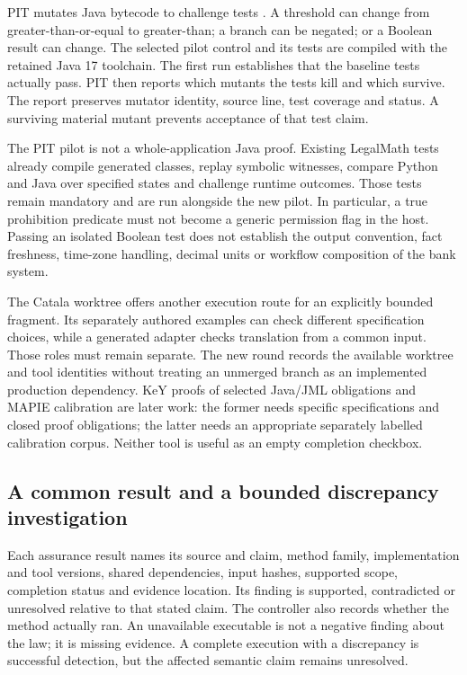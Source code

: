 \documentclass[12pt,a4paper,oneside,openany]{book}
\begin{document}
PIT mutates Java bytecode to challenge tests \citep{pitsoftware}. A threshold can
change from greater-than-or-equal to greater-than; a branch can be negated; or a
Boolean result can change. The selected pilot control and its tests are compiled
with the retained Java 17 toolchain. The first run establishes that the baseline
tests actually pass. PIT then reports which mutants the tests kill and which
survive. The report preserves mutator identity, source line, test coverage and
status. A surviving material mutant prevents acceptance of that test claim.

The PIT pilot is not a whole-application Java proof. Existing LegalMath tests
already compile generated classes, replay symbolic witnesses, compare Python
and Java over specified states and challenge runtime outcomes. Those tests remain
mandatory and are run alongside the new pilot. In particular, a true prohibition
predicate must not become a generic permission flag in the host. Passing an
isolated Boolean test does not establish the output convention, fact freshness,
time-zone handling, decimal units or workflow composition of the bank system.

The Catala worktree offers another execution route for an explicitly bounded
fragment. Its separately authored examples can check different specification
choices, while a generated adapter checks translation from a common input. Those
roles must remain separate. The new round records the available worktree and
tool identities without treating an unmerged branch as an implemented production
dependency. KeY proofs of selected Java/JML obligations and MAPIE calibration
are later work: the former needs specific specifications and closed proof
obligations; the latter needs an appropriate separately labelled calibration
corpus. Neither tool is useful as an empty completion checkbox.

\subsection{A common result and a bounded discrepancy investigation}

Each assurance result names its source and claim, method family, implementation
and tool versions, shared dependencies, input hashes, supported scope, completion
status and evidence location. Its finding is supported, contradicted or
unresolved relative to that stated claim. The controller also records whether
the method actually ran. An unavailable executable is not a negative finding
about the law; it is missing evidence. A complete execution with a discrepancy
is successful detection, but the affected semantic claim remains unresolved.
\end{document}
